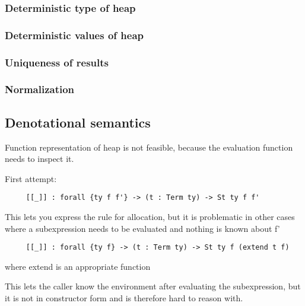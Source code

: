 \documentclass{article}
\begin{document}

\subsubsection{Deterministic type of heap}


\subsubsection{Deterministic values of heap}


\subsubsection{Uniqueness of results}


\subsubsection{Normalization}


\subsection{Denotational semantics}

Function representation of heap is not feasible, because the
evaluation function needs to inspect it.

First attempt:

\begin{lstlisting}
     [[_]] : forall {ty f f'} -> (t : Term ty) -> St ty f f'
\end{lstlisting}

This lets you express the rule for allocation, but it is problematic
in other cases where a subexpression needs to be evaluated and
nothing is known about f'


\begin{lstlisting}
     [[_]] : forall {ty f} -> (t : Term ty) -> St ty f (extend t f)
\end{lstlisting}
where extend is an appropriate function

This lets the caller know the environment after evaluating the
subexpression, but it is not in constructor form and is therefore
hard to reason with.
\end{document}
